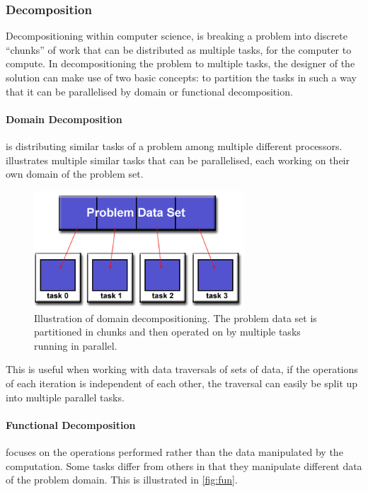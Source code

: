 \subsubsection{Decomposition}
Decompositioning within computer science, is breaking a problem into discrete \enquote{chunks} of work that can be distributed as multiple tasks, for the computer to compute. In decompositioning the problem to multiple tasks, the designer of the solution can make use of two basic concepts: to partition the tasks in such a way that it can be parallelised by domain or functional decomposition.

\paragraph{Domain Decomposition} is distributing similar tasks of a problem among multiple different processors.  illustrates multiple similar tasks that can be parallelised, each working on their own domain of the problem set.

\begin{figure}[htbp]
\centering
\includegraphics[width=0.7\textwidth]{Analysis/Supercomputing/domain_decomp.png}
\caption{Illustration of domain decompositioning. The problem data set is partitioned in chunks and then operated on by multiple tasks running in parallel. \cite{compLLNL}}\label{fig:dom}
\end{figure}

This is useful when working with data traversals of sets of data, if the operations of each iteration is independent of each other, the traversal can easily be split up into multiple parallel tasks.

\paragraph{Functional Decomposition} focuses on the operations performed rather than the data manipulated by the computation. Some tasks differ from others in that they manipulate different data of the problem domain. This is illustrated in \cref{fig:fun}.

